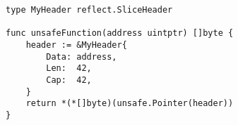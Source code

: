 \begin{lstlisting}[language=Golang, label=lst:go-safer-sliceheader-alternative-code, caption=SliceHeader alias type detected by \toolSafer{}]
type MyHeader reflect.SliceHeader

func unsafeFunction(address uintptr) []byte {
    header := &MyHeader{
        Data: address,
        Len:  42,
        Cap:  42,
    }
    return *(*[]byte)(unsafe.Pointer(header))
}
\end{lstlisting}
